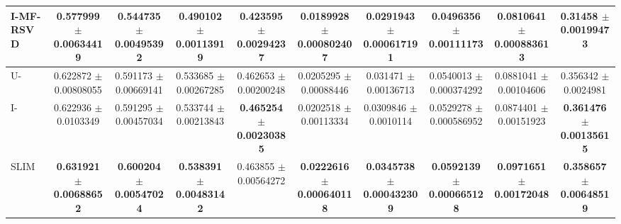 \begin{table}
{\begin{tabular}{l|cccc|cccc|c}
		I-MF-RSVD & \num{0.577999} $\pm$ \num{0.00634419}&\num{0.544735} $\pm$ \num{0.00495392}&\num{0.490102} $\pm$ \num{0.00113919}&\num{0.423595} $\pm$ \num{0.00294237}&\num{0.0189928} $\pm$ \num{0.000802407}&\num{0.0291943} $\pm$ \num{0.000617191}&\num{0.0496356} $\pm$ \num{0.00111173}&\num{0.0810641} $\pm$ \num{0.000883613}&\num{0.31458} $\pm$ \num{0.00199473}\\
		
		\hline
		U-\LinearLow & \num{0.622872} $\pm$ \num{0.00808055}&\num{0.591173} $\pm$ \num{0.00669141}&\num{0.533685} $\pm$ \num{0.00267285}&\num{0.462653} $\pm$ \num{0.00200248}&\num{0.0205295} $\pm$ \num{0.00088446}&\num{0.031471} $\pm$ \num{0.00136713}&\num{0.0540013} $\pm$ \num{0.000374292}&\num{0.0881041} $\pm$ \num{0.00104606}&\num{0.356342} $\pm$ \num{0.0024981} \\

		I-\LinearLow & \num{0.622936} $\pm$ \num{0.0103349}&\num{0.591295} $\pm$ \num{0.00457034}&\num{0.533744} $\pm$ \num{0.00213843}& \textbf{\num{0.465254}} $\pm$ \textbf{\num{0.00230385}} & \num{0.0202518} $\pm$ \num{0.00113334}&\num{0.0309846} $\pm$ \num{0.0010114}&\num{0.0529278} $\pm$ \num{0.000586952}&\num{0.0874401} $\pm$ \num{0.00151923}&\textbf{\num{0.361476}} $\pm$ \textbf{\num{0.00135615}} \\

		SLIM & \textbf{\num{0.631921}} $\pm$ \textbf{\num{0.00688652}} & \textbf{\num{0.600204}} $\pm$ \textbf{\num{0.00547024}} & \textbf{\num{0.538391}} $\pm$ \textbf{\num{0.00483142}} & \num{0.463855} $\pm$ \num{0.00564272}& \textbf{\num{0.0222616}} $\pm$ \textbf{\num{0.000640118}} & \textbf{\num{0.0345738}} $\pm$ \textbf{\num{0.000432309}} & \textbf{\num{0.0592139}} $\pm$ \textbf{\num{0.000665128}} & \textbf{\num{0.0971651}} $\pm$ \textbf{\num{0.00172048}} & \textbf{\num{0.358657}} $\pm$ \textbf{\num{0.00648519}}\\
		\hline

	\end{tabular}
}

\end{table}


